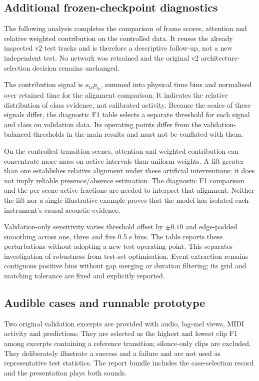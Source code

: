 \subsection*{Additional frozen-checkpoint diagnostics}
The following analysis completes the comparison of frame scores, attention and relative weighted contribution on the controlled data. It reuses the already inspected v2 test tracks and is therefore a descriptive follow-up, not a new independent test. No network was retrained and the original v2 architecture-selection decision remains unchanged.

The contribution signal is $a_{tc}p_{tc}$, summed into physical time bins and normalised over retained time for the alignment comparison. It indicates the relative distribution of class evidence, not calibrated activity. Because the scales of these signals differ, the diagnostic F1 table selects a separate threshold for each signal and class on validation data. Its operating points differ from the validation-balanced thresholds in the main results and must not be conflated with them.

On the controlled transition scenes, attention and weighted contribution can concentrate more mass on active intervals than uniform weights. A lift greater than one establishes relative alignment under these artificial interventions; it does not imply reliable presence/absence estimation. The diagnostic F1 comparison and the per-scene active fractions are needed to interpret that alignment. Neither the lift nor a single illustrative example proves that the model has isolated each instrument's causal acoustic evidence.

Validation-only sensitivity varies threshold offset by $\pm0.10$ and edge-padded smoothing across one, three and five 0.5 s bins. The table reports these perturbations without adopting a new test operating point. This separates investigation of robustness from test-set optimisation. Event extraction remains contiguous positive bins without gap merging or duration filtering; its grid and matching tolerance are fixed and explicitly reported.


\subsection*{Audible cases and runnable prototype}
Two original validation excerpts are provided with audio, log-mel views, MIDI activity and predictions. They are selected as the highest and lowest clip F1 among excerpts containing a reference transition; silence-only clips are excluded. They deliberately illustrate a success and a failure and are not used as representative test statistics. The report bundle includes the case-selection record and the presentation plays both sounds.

